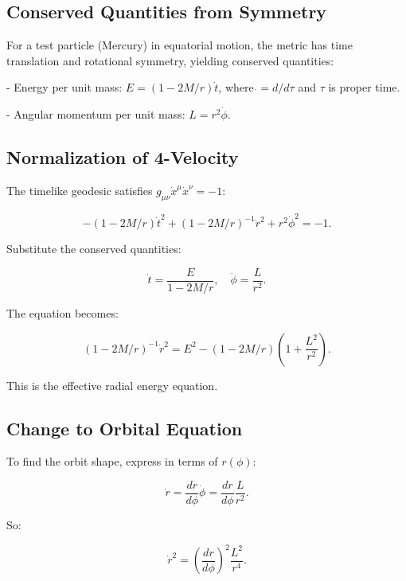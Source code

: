 \documentclass{article}
\begin{document}
\subsection{Conserved Quantities from Symmetry}

For a test particle (Mercury) in equatorial motion, the metric has time translation and rotational symmetry, yielding conserved quantities:

- Energy per unit mass: \( E = (1 - 2M/r) \dot{t} \), where \(\dot{} = d/d\tau\) and \(\tau\) is proper time.

- Angular momentum per unit mass: \( L = r^2 \dot{\phi}\).

\subsection{Normalization of 4-Velocity}

The timelike geodesic satisfies \(g_{\mu\nu} \dot{x}^\mu \dot{x}^\nu = -1\):

\begin{equation}
 - (1 - 2M/r) \dot{t}^2 + (1 - 2M/r)^{-1} \dot{r}^2 + r^2 \dot{\phi}^2 = -1.
\end{equation}

Substitute the conserved quantities:

\begin{equation}
\dot{t} = \frac{E}{1 - 2M/r}, \quad \dot{\phi} = \frac{L}{r^2}.
\end{equation}

The equation becomes:

\begin{equation}
 (1 - 2M/r)^{-1} \dot{r}^2 = E^2 - (1 - 2M/r) \left(1 + \frac{L^2}{r^2}\right).
\end{equation}

This is the effective radial energy equation.

\subsection{Change to Orbital Equation}

To find the orbit shape, express in terms of \(r(\phi)\):

\begin{equation}
 \dot{r} = \frac{dr}{d\phi} \dot{\phi} = \frac{dr}{d\phi} \frac{L}{r^2}.
\end{equation}

So:

\begin{equation}
 \dot{r}^2 = \left(\frac{dr}{d\phi}\right)^2 \frac{L^2}{r^4}.
\end{equation}
\end{document}
